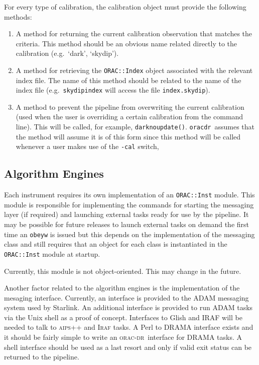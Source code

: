 \documentclass[twoside,11pt]{article}
\renewcommand{\_}{\texttt{\symbol{95}}}
\newcommand{\Oracdr}{\textsc{orac-dr}}
\newcommand{\oracdr}{\texttt{oracdr}}
\begin{document}
For every type of calibration, the calibration object must provide the 
following methods:
\begin{enumerate}
\item A method for returning the current calibration observation that
matches the criteria. This method should be an obvious name related
directly to the calibration (e.g.\ `dark', `skydip').
\item A method for retrieving the \texttt{ORAC::Index} object
associated with the relevant index file. The name of this method
should be related to the name of the index file (e.g.\
\texttt{skydipindex} will access the file \texttt{index.skydip}).
\item A method to prevent the pipeline from overwriting the current
calibration (used when the user is overriding a certain calibration
from the command line). This will be called, for example,
\texttt{darknoupdate()}. \oracdr\ assumes that the method will assume
it is of this form since this method will be called whenever a user
makes use of the \texttt{-cal} switch,

\end{enumerate}



\subsection{Algorithm Engines}

Each instrument requires its own implementation of an
\texttt{ORAC::Inst} module. This module is responsible for
implementing the commands for starting the messaging layer (if
required) and launching external tasks ready for use by the
pipeline. It may be possible for future releases to launch
external tasks on demand the first time an \texttt{obeyw} is
issued but this depends on the implementation of the messaging class and 
still requires that an object for each class is instantiated in the
\texttt{ORAC::Inst} module at startup.

Currently, this module is not object-oriented. This may change in the
future.

Another factor related to the algorithm engines is the implementation
of the mesaging interface. Currently, an interface is provided to the 
ADAM messaging system used by Starlink. An additional interface is
provided to run ADAM tasks via the Unix shell as a proof of concept.
Interfaces to Glish and IRAF will be needed to talk to \textsc{aips++}
and \textsc{Iraf} tasks. A Perl to DRAMA interface exists and it
should be fairly simple to write an \Oracdr\ interface for
DRAMA tasks. A shell interface should be used as a last
resort and only if valid exit status can be returned to the pipeline.
\end{document}
